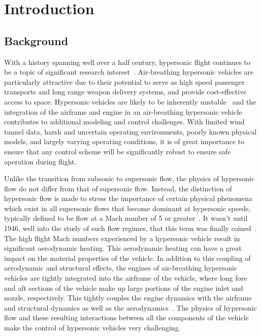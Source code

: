 \chapter{Introduction}

\section{Background}

With a history spanning well over a half century, hypersonic flight continues to be a topic of significant research interest\ \cite{parker.control.2007,gibson.adaptive.2009,kothari.reusable.2010,dalle.envelope.2011,brocanelli.unstartrecovery.2012}.
Air-breathing hypersonic vehicles are particularly attractive due to their potential to serve as high speed passenger transports and long range weapon delivery systems, and provide cost-effective access to space.
Hypersonic vehicles are likely to be inherently unstable\ \cite{mcruer.hypersonic.1991,mirmirani.airbreathing.2005,bolender.hypersonicmodel.2007} and the integration of the airframe and engine in an air-breathing hypersonic vehicle contributes to additional modeling and control challenges.
With limited wind tunnel data, harsh and uncertain operating environments, poorly known physical models, and largely varying operating conditions, it is of great importance to ensure that any control scheme will be significantly robust to ensure safe operation during flight.

Unlike the transition from subsonic to supersonic flow, the physics of hypersonic flow do not differ from that of supersonic flow.
Instead, the distinction of hypersonic flow is made to stress the importance of certain physical phenomena which exist in all supersonic flows that become dominant at hypersonic speeds, typically defined to be flow at a Mach number of 5 or greater\ \cite{anderson.aerodynamics.2010}.
It wasn't until 1946, well into the study of such flow regimes, that this term was finally coined\ \cite{Tsien2012443}.
The high flight Mach numbers experienced by a hypersonic vehicle result in significant aerodynamic heating.
This aerodynamic heating can have a great impact on the material properties of the vehicle.
In addition to this coupling of aerodynamic and structural effects, the engines of air-breathing hypersonic vehicles are tightly integrated into the airframe of the vehicle, where long fore and aft sections of the vehicle make up large portions of the engine inlet and nozzle, respectively.
This tightly couples the engine dynamics with the airframe and structural dynamics as well as the aerodynamics\ \cite{chavez.flightdynamics.1994}.
The physics of hypersonic flow and these resulting interactions between all the components of the vehicle make the control of hypersonic vehicles very challenging.

